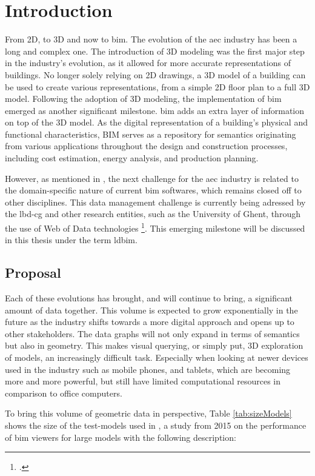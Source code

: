 \chapter{Introduction}
From 2D, to 3D and now to \acs{bim}. The evolution of the \ac{aec} industry has been a long and complex one. The introduction of 3D modeling was the first major step in the industry's evolution, as it allowed for more accurate representations of buildings. No longer solely relying on 2D drawings, a 3D model of a building can be used to create various representations, from a simple 2D floor plan to a full 3D model. Following the adoption of 3D modeling, the implementation of \ac{bim} emerged as another significant milestone. \ac{bim} adds an extra layer of information on top of the 3D model. As the digital representation of a building's physical and functional characteristics, BIM serves as a repository for semantics originating from various applications throughout the design and construction processes, including cost estimation, energy analysis, and production planning.

\label{sec:intro}
However, as mentioned in \cite{Werbrouck2018}, the next challenge for the \ac{aec} industry is related to the domain-specific nature of current \ac{bim} softwares, which remains closed off to other disciplines. This data management challenge is currently being adressed by the \ac{lbd-cg} and other research entities, such as the University of Ghent, through the use of Web of Data technologies \footcite{ldbimGroup}. This emerging milestone will be discussed in this thesis under the term \ac{ldbim}.

\section{Proposal} \label{sec:proposal}
Each of these evolutions has brought, and will continue to bring, a significant amount of data together. This volume is expected to grow exponentially in the future as the industry shifts towards a more digital approach and opens up to other stakeholders. The data graphs will not only expand in terms of semantics but also in geometry. This makes visual querying, or simply put, 3D exploration of models, an increasingly difficult task. Especially when looking at newer devices used in the industry such as mobile phones, and tablets, which are becoming more and more powerful, but still have limited computational resources in comparison to office computers.

To bring this volume of geometric data in perspective, Table \ref{tab:sizeModels} shows the size of the test-models used in \cite{Johansson2015} , a study from 2015 on the performance of \ac{bim} viewers for large models with the following description:

